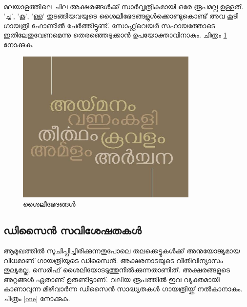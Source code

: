 \documentclass[12pt]{article}
\begin{document}
	\paragraph{}
	മലയാളത്തിലെ ചില അക്ഷരങ്ങള്‍ക്ക് സാര്‍വ്വത്രികമായി ഒരേ രൂപമല്ല ഉള്ളത്. 'ച്ച', 'കൂ', 'ള്ള' തുടങ്ങിയവയുടെ ശൈലീഭേദങ്ങളുള്‍ക്കൊണ്ടുകൊണ്ട് അവ കൂടി ഗായത്രി ഫോണ്ടില്‍ ചേര്‍ത്തിട്ടുണ്ട്. സോഫ്റ്റ്‌വെയര്‍ സഹായത്തോടെ ഇതിലേതുവേണമെന്നു തെരഞ്ഞെടുക്കാന്‍ ഉപയോക്താവിനാകും. ചിത്രം \ref{style} നോക്കുക. 
	‍ 
	\begin{figure}
		\begin{centering}
			\includegraphics[width=0.8\textwidth]{style.jpg}
			\caption{ശൈലീഭേദങ്ങള്‍}
			\label{style}
		\end{centering}
	\end{figure}
	
	
	\subsection{ഡിസൈന്‍ സവിശേഷതകള്‍}
	
	ആമുഖത്തില്‍ സൂചിപ്പിച്ചിരിക്കുന്നതുപോലെ തലക്കെട്ടുകള്‍ക്ക് അനുയോജ്യമായ വിധമാണ് ഗായത്രിയുടെ ഡിസൈന്‍. അക്ഷരനാടയുടെ വീതിവിന്യാസം തുല്യമല്ല. സെരിഫ് ശൈലിയോടടുത്തുനില്‍ക്കുന്നതാണിത്. അക്ഷരങ്ങളുടെ അറ്റങ്ങള്‍ ഏതാണ്ട് ഉരുണ്ടിട്ടാണ്. വലിയ രൂപത്തില്‍ ഇവ വ്യക്തമായി കാണാവുന്ന മിഴിവാര്‍ന്ന ഡിസൈന്‍ സാദ്ധ്യതകള്‍ ഗായത്രിയ്ക്ക് നല്‍കാനാകും.  ചിത്രം \ref{one} നോക്കുക.
	
\end{document}
